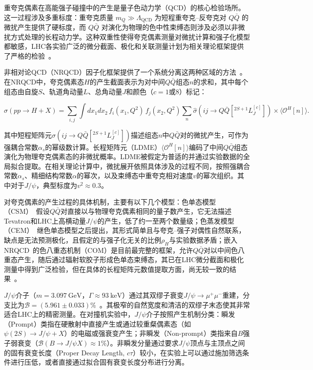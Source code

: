 重夸克偶素在高能强子碰撞中的产生是量子色动力学（QCD）的核心检验场所。这一过程涉及多重标度：重夸克质量 $m_Q \gg \Lambda_\mathrm{QCD}$ 为短程重夸克--反夸克对 $Q\bar{Q}$ 的微扰产生提供了硬标度，而 $Q\bar{Q}$ 对演化为物理的色中性束缚态则涉及必须以非微扰方式处理的长程动力学。这种双重性使得夸克偶素测量对微扰计算和强子化模型都敏感，LHC各实验广泛的微分截面、极化和关联测量计划为相关理论框架提供了严格的检验~\cite{LANSBERG_QUARKONIUM_REVIEW,zhaoExperimentalReviewQuarkonium2025}。

非相对论QCD（NRQCD）因子化框架提供了一个系统分离这两种区域的方法~\cite{NRQCD_BBL1995}。在NRQCD中，夸克偶素态$H$的产生截面表示为对中间$Q\bar{Q}$组态$n$的求和，其中每个组态由自旋$S$、轨道角动量$L$、总角动量$J$和颜色（$c=1$或$8$）标记：

\begin{equation}
\label{eq:nrqcd-factorization}
  \sigma(pp \to H+X) = \sum_{i,j} \int dx_1 dx_2 \, f_i(x_1, Q^2) \, f_j(x_2, Q^2) \sum_n \hat{\sigma}(ij \to Q\bar{Q}[^{2S+1}L_J^{[c]}]) \times \langle\mathcal{O}^H[n]\rangle .
\end{equation}

其中短程矩阵元$\hat{\sigma}(ij \to Q\bar{Q}[^{2S+1}L_J^{[c]}])$描述组态$n$中$Q\bar{Q}$对的微扰产生，可作为强耦合常数$\alpha_s$的幂级数计算。长程矩阵元（LDME）$\langle\mathcal{O}^H[n]\rangle$编码了中间$Q\bar{Q}$组态演化为物理夸克偶素态的非微扰概率。LDME被假定为普适的并通过实验数据的全局拟合提取。在相关理论计算中，微扰展开依照具体涉及的过程不同，按照强耦合常数$\alpha_s$、精细结构常数$\alpha$的幂次，以及束缚态中重夸克相对速度$v$的幂次组织。其中对于$J/\psi$，典型标度为$v^2 \approx 0.3$。

对夸克偶素的产生过程的具体机制，主要有以下几个模型：色单态模型（CSM）~\cite{Einhorn:1975:CSM,Berger:1981:CSM,Baier:1981:CSM}假设$Q\bar{Q}$对直接以与物理夸克偶素相同的量子数产生，它无法描述Tevatron和LHC上高横动量$J/\psi$的产生，低了约一至两个数量级；色蒸发模型（CEM）~\cite{Fritzsch:1977:CEM,Halzen:1977:CEM}继色单态模型之后提出，其形式简单且与夸克--强子对偶性自然联系，缺点是无法预测极化，且假定的与强子化无关的比例$\rho_H$与实验数据矛盾；嵌入NRQCD~\cite{NRQCD_BBL1995}的色八重态机制（COM）是目前最完整的框架，允许$Q\bar{Q}$对以中间色八重态产生，随后通过辐射软胶子形成色单态束缚态，其已在LHC微分截面和极化测量中得到广泛检验，但在具体的长程矩阵元数值提取方面，尚无较一致的结果~\cite{Lansberg:2019:JpsiPair,Lansberg:2020:NewObservables,LANSBERG_QUARKONIUM_REVIEW,zhaoExperimentalReviewQuarkonium2025}。


$J/\psi$介子（$m = \SI{3.097}{\giga\eV}$，$\Gamma \approx \SI{93}{\kilo\eV}$）通过其双缪子衰变$J/\psi \to \mu^+\mu^-$重建，分支比为$\mathcal{B} = (5.961 \pm 0.033)\%$~\cite{PDG2024}。其极窄的自然宽度和清洁的双缪子末态使其非常适合LHC上的精密测量。在对撞机实验中，$J/\psi$介子按照产生机制分类：瞬发（Prompt）类指在硬散射中直接产生或通过较重粲偶素态（如$\psi(2S) \to J/\psi + X$）的电磁或强衰变产生；非瞬发（Non-prompt）类指来自$B$强子弱衰变（$\mathcal{B}(B \to J/\psi X) \approx 1\%$）。非瞬发分量通过要求$J/\psi$顶点与主顶点之间的固有衰变长度（Proper Decay Length, $c\tau$）较小，在实验上可以通过施加筛选条件进行压低，或者直接通过拟合固有衰变长度分布进行分离。

